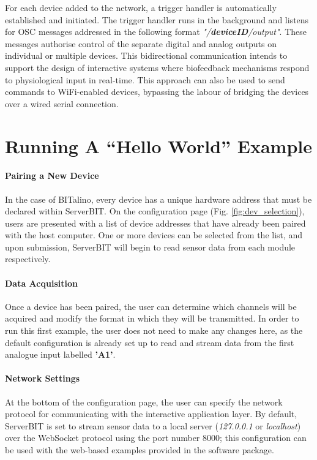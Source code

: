 For each device added to the network, a trigger handler is automatically established and initiated. The trigger handler runs in the background and listens for OSC messages addressed in the following format \textit{"/\textbf{deviceID}/output"}. These messages authorise control of the separate digital and analog outputs on individual or multiple devices. This bidirectional communication intends to support the design of interactive systems where biofeedback mechanisms respond to physiological input in real-time. This approach can also be used to send commands to WiFi-enabled devices, bypassing the labour of bridging the devices over a wired serial connection.

\section{Running A ``Hello World'' Example}

\paragraph{Pairing a New Device} \label{Pairing}
In the case of BITalino, every device has a unique hardware address that must be declared within ServerBIT. On the configuration page (Fig. \ref{fig:dev_selection}), users are presented with a list of device addresses that have already been paired with the host computer. One or more devices can be selected from the list, and upon submission, ServerBIT will begin to read sensor data from each module respectively.

\paragraph{Data Acquisition}
Once a device has been paired, the user can determine which channels will be acquired and modify the format in which they will be transmitted. In order to run this first example, the user does not need to make any changes here, as the default configuration is already set up to read and stream data from the first analogue input labelled \textbf{'A1'}.

\paragraph{Network Settings}
At the bottom of the configuration page, the user can specify the network protocol for communicating with the interactive application layer. By default, ServerBIT is set to stream sensor data to a local server (\textit{127.0.0.1} or \textit{localhost}) over the WebSocket protocol using the port number 8000; this configuration can be used with the web-based examples provided in the software package.

